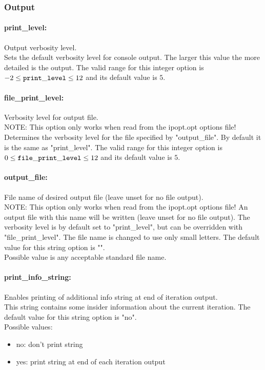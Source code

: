 \subsubsection{Output}
\label{sec:Output}

\paragraph{print\_level:}\label{sec:print_level} Output verbosity level. $\;$ \\
 Sets the default verbosity level for console
output. The larger this value the more detailed
is the output. The valid range for this integer option is
$-2 \le {\tt print\_level } \le 12$
and its default value is $5$.


\paragraph{file\_print\_level:}\label{sec:file_print_level} Verbosity level for output file. $\;$ \\
 NOTE: This option only works when read from the
ipopt.opt options file! Determines the verbosity
level for the file specified by "output\_file". 
By default it is the same as "print\_level". The valid range for this integer option is
$0 \le {\tt file\_print\_level } \le 12$
and its default value is $5$.


\paragraph{output\_file:}\label{sec:output_file} File name of desired output file (leave unset for no file output). $\;$ \\
 NOTE: This option only works when read from the
ipopt.opt options file! An output file with this
name will be written (leave unset for no file
output).  The verbosity level is by default set
to "print\_level", but can be overridden with
"file\_print\_level".  The file name is changed
to use only small letters.
The default value for this string option is "".
\\ 
Possible value is any acceptable standard file name.

\paragraph{print\_info\_string:}\label{sec:print_info_string} Enables printing of additional info string at end of iteration output. $\;$ \\
 This string contains some insider information
about the current iteration.
The default value for this string option is "no".
\\ 
Possible values:
\begin{itemize}
   \item no: don't print string
   \item yes: print string at end of each iteration output
\end{itemize}

